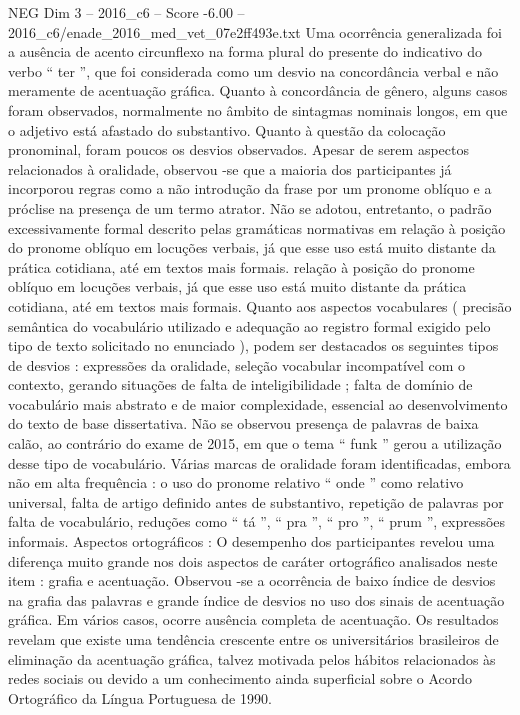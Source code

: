 \begin{textsample}{NEG Dim 3 – 2016\_c6 – Score -6.00 – 2016\_c6/enade\_2016\_med\_vet\_07e2ff493e.txt}
Uma ocorrência generalizada foi a ausência de acento circunflexo na forma plural do presente do indicativo do verbo “ ter ”, que foi considerada como um desvio na concordância verbal e não meramente de acentuação gráfica.
Quanto à concordância de gênero, alguns casos foram observados, normalmente no âmbito de sintagmas nominais longos, em que o adjetivo está afastado do substantivo.
Quanto à questão da colocação pronominal, foram poucos os desvios observados.
Apesar de serem aspectos relacionados à oralidade, observou -se que a maioria dos participantes já incorporou regras como a não introdução da frase por um pronome oblíquo e a próclise na presença de um termo atrator.
Não se adotou, entretanto, o padrão excessivamente formal descrito pelas gramáticas normativas em relação à posição do pronome oblíquo em locuções verbais, já que esse uso está muito distante da prática cotidiana, até em textos mais formais. relação à posição do pronome oblíquo em locuções verbais, já que esse uso está muito distante da prática cotidiana, até em textos mais formais.
Quanto aos aspectos vocabulares ( precisão semântica do vocabulário utilizado e adequação ao registro formal exigido pelo tipo de texto solicitado no enunciado ), podem ser destacados os seguintes tipos de desvios : expressões da oralidade, seleção vocabular incompatível com o contexto, gerando situações de falta de inteligibilidade ; falta de domínio de vocabulário mais abstrato e de maior complexidade, essencial ao desenvolvimento do texto de base dissertativa.
Não se observou presença de palavras de baixa calão, ao contrário do exame de 2015, em que o tema “ funk ” gerou a utilização desse tipo de vocabulário.
Várias marcas de oralidade foram identificadas, embora não em alta frequência : o uso do pronome relativo “ onde ” como relativo universal, falta de artigo definido antes de substantivo, repetição de palavras por falta de vocabulário, reduções como “ tá ”, “ pra ”, “ pro ”, “ prum ”, expressões informais.
Aspectos ortográficos : O desempenho dos participantes revelou uma diferença muito grande nos dois aspectos de caráter ortográfico analisados neste item : grafia e acentuação.
Observou -se a ocorrência de baixo índice de desvios na grafia das palavras e grande índice de desvios no uso dos sinais de acentuação gráfica.
Em vários casos, ocorre ausência completa de acentuação.
Os resultados revelam que existe uma tendência crescente entre os universitários brasileiros de eliminação da acentuação gráfica, talvez motivada pelos hábitos relacionados às redes sociais ou devido a um conhecimento ainda superficial sobre o Acordo Ortográfico da Língua Portuguesa de 1990.

\end{textsample}
